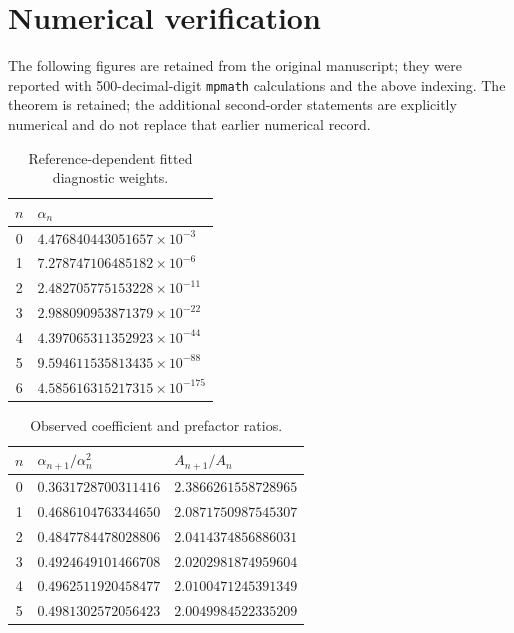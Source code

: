 \documentclass[11pt]{article}
\theoremstyle{definition}\newtheorem{remark}{Remark}\newtheorem{observation}{Numerical Observation}
\begin{document}
\section{Numerical verification}
The following figures are retained from the original manuscript; they were reported with 500-decimal-digit \texttt{mpmath} calculations and the above indexing. The theorem is retained; the additional second-order statements are explicitly numerical and do not replace that earlier numerical record.
\begin{table}[ht]\centering\small
\begin{tabular}{cl}\toprule $n$ & $\alpha_n$ \\\midrule
0 & $4.476840443051657\times10^{-3}$\\
1 & $7.278747106485182\times10^{-6}$\\
2 & $2.482705775153228\times10^{-11}$\\
3 & $2.988090953871379\times10^{-22}$\\
4 & $4.397065311352923\times10^{-44}$\\
5 & $9.594611535813435\times10^{-88}$\\
6 & $4.585616315217315\times10^{-175}$\\\bottomrule
\end{tabular}\caption{Reference-dependent fitted diagnostic weights.}\end{table}
\begin{table}[ht]\centering\small
\begin{tabular}{cll}\toprule $n$ & $\alpha_{n+1}/\alpha_n^2$ & $A_{n+1}/A_n$\\\midrule
0 & $0.3631728700311416$ & $2.3866261558728965$\\
1 & $0.4686104763344650$ & $2.0871750987545307$\\
2 & $0.4847784478028806$ & $2.0414374856886031$\\
3 & $0.4924649101466708$ & $2.0202981874959604$\\
4 & $0.4962511920458477$ & $2.0100471245391349$\\
5 & $0.4981302572056423$ & $2.0049984522335209$\\\bottomrule
\end{tabular}\caption{Observed coefficient and prefactor ratios.}\end{table}
\end{document}
